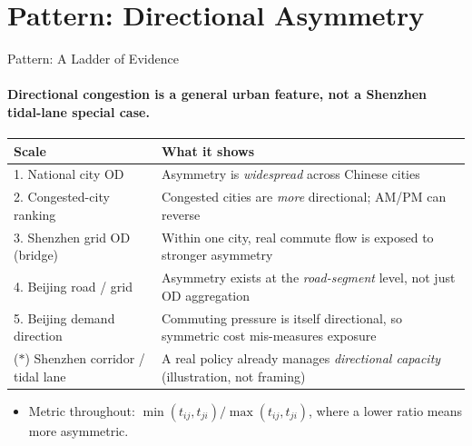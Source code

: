 \documentclass[11pt,aspectratio=169]{beamer}
\newcommand{\good}[1]{\textcolor{blue!70!black}{#1}}
\begin{document}
\section{Pattern: Directional Asymmetry}
\begin{frame}{Pattern: A Ladder of Evidence}
\framesubtitle{Directional congestion is a \good{general urban feature}, not a Shenzhen tidal-lane special case.}
\footnotesize
\begin{tabularx}{\textwidth}{@{}p{}X@{}}
\toprule
Scale & What it shows \\
\midrule
1. National city OD & Asymmetry is \emph{widespread} across Chinese cities \\
2. Congested-city ranking & Congested cities are \emph{more} directional; AM/PM can reverse \\
3. \good{Shenzhen grid OD (bridge)} & Within one city, \good{real commute flow} is exposed to stronger asymmetry \\
4. Beijing road / grid & Asymmetry exists at the \emph{road-segment} level, not just OD aggregation \\
5. Beijing demand direction & Commuting pressure is itself directional, so symmetric cost mis-measures exposure \\
\midrule
($\ast$) Shenzhen corridor / tidal lane & A real policy already manages \emph{directional capacity} (illustration, not framing) \\
\bottomrule
\end{tabularx}
\vspace{0.4em}
\begin{itemize}\footnotesize
  \item Metric throughout: $\min(t_{ij},t_{ji})/\max(t_{ij},t_{ji})$, where a lower ratio means more asymmetric.
\end{itemize}
\end{frame}
\end{document}
